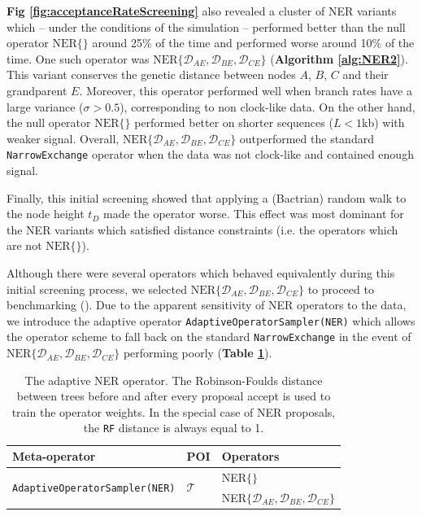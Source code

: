 \documentclass[10pt,letterpaper]{article}
\begin{document}
\textbf{Fig \ref{fig:acceptanceRateScreening}} also revealed a cluster of NER variants which -- under the conditions of the simulation --  performed better than the null operator $\text{NER}\{\}$ around 25\% of the time and performed worse around 10\% of the time. 
One such operator was  $\text{NER}\{\mathcal{D}_{AE}, \mathcal{D}_{BE}, \mathcal{D}_{CE}\}$  (\textbf{Algorithm \ref{alg:NER2}}). 
This variant conserves the genetic distance between nodes $A$, $B$, $C$ and their grandparent $E$. 
Moreover, this operator performed well when branch rates have a large variance ($\sigma > 0.5$), corresponding to non clock-like data. 
On the other hand, the null operator $\text{NER}\{\}$ performed better on shorter sequences ($L < 1$kb) with weaker signal.  
Overall, $\text{NER}\{\mathcal{D}_{AE}, \mathcal{D}_{BE}, \mathcal{D}_{CE}\}$ outperformed the standard \texttt{NarrowExchange} operator when the data was not clock-like and contained enough signal. 



Finally, this initial screening showed that applying a (Bactrian) random walk to the node height $t_D$ made the operator worse.
This effect was most dominant for the NER variants which satisfied distance constraints (i.e. the operators which are not $\text{NER}\{\}$).




Although there were several operators which behaved equivalently during this initial screening process, we selected $\text{NER}\{\mathcal{D}_{AE}, \mathcal{D}_{BE}, \mathcal{D}_{CE}\}$ to proceed to benchmarking (\textbf{}).
Due to the apparent sensitivity of NER operators to the data, we introduce the adaptive operator \texttt{AdaptiveOperatorSampler(NER)} which allows the operator scheme to fall back on the standard \texttt{NarrowExchange} in the event of $\text{NER}\{\mathcal{D}_{AE}, \mathcal{D}_{BE}, \mathcal{D}_{CE}\}$ performing poorly (\textbf{Table \ref{table:adaptiveNER}}).





\begin{table}[h!]
\centering
\begin{tabular}{l l l} 
 Meta-operator & POI & Operators \\
\hline
 \multirow{2}{*}{\texttt{AdaptiveOperatorSampler(NER)}} & \multirow{2}{*}{$\mathcal{T}$} & NER$\{  \}$ \\ 
 && NER$\{ \mathcal{D}_{AE}, \mathcal{D}_{BE}, \mathcal{D}_{CE} \}$ \\
\end{tabular}
\caption{The adaptive NER operator. 
The Robinson-Foulds distance between trees before and after every proposal accept is used to train the operator weights. In the special case of NER proposals, the \texttt{RF} distance is always equal to 1. }
\label{table:adaptiveNER}
\end{table}
\end{document}
